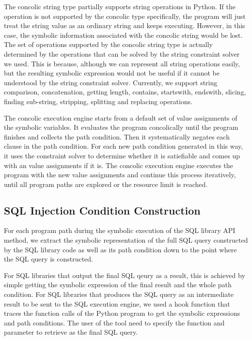 \documentclass[conference]{IEEEtran}
\begin{document}
The concolic string type partially supports string operations in Python. If the operation is not supported by the concolic type specifically, the program will just treat the string value as an ordinary string and keeps executing. However, in this case, the symbolic information associated with the concolic string would be lost. The set of operations supported by the concolic string type is actually determined by the operations that can be solved by the string constraint solver we used. This is because, although we can represent all string operations easily, but the resulting symbolic expression would not be useful if it cannot be understood by the string constraint solver. Currently, we support string comparison, concatenation, getting length, contains, startswith, endswith, slicing, finding sub-string, stripping, splitting and replacing operations.

The concolic execution engine starts from a default set of value assignments of the symbolic variables. It evaluates the program concolically until the program finishes and collects the path condition. Then it systematically negates each clause in the path condition. For each new path condition generated in this way, it uses the constraint solver to determine whether it is satiefiable and comes up with an value assignments if it is. The concolic execution engine executes the program with the new value assignments and continue this process iteratively, until all program paths are explored or the resource limit is reached.

\subsection{SQL Injection Condition Construction}

For each program path during the symbolic execution of the SQL library API method, we extract the symbolic representation of the full SQL query constructed by the SQL library code as well as its path condition down to the point where the SQL query is constructed. 

For SQL libraries that output the final SQL qeury as a result, this is achieved by simple getting the symbolic expression of the final result and the whole path condition.
For SQL libraries that produces the SQL query as an intermediate result to be sent to the SQL execution engine, we used a hook function that traces the function calls of the Python program to get the symbolic expressions and path conditions. The user of the tool need to specify the function and parameter to retrieve as the final SQL query.
\end{document}
